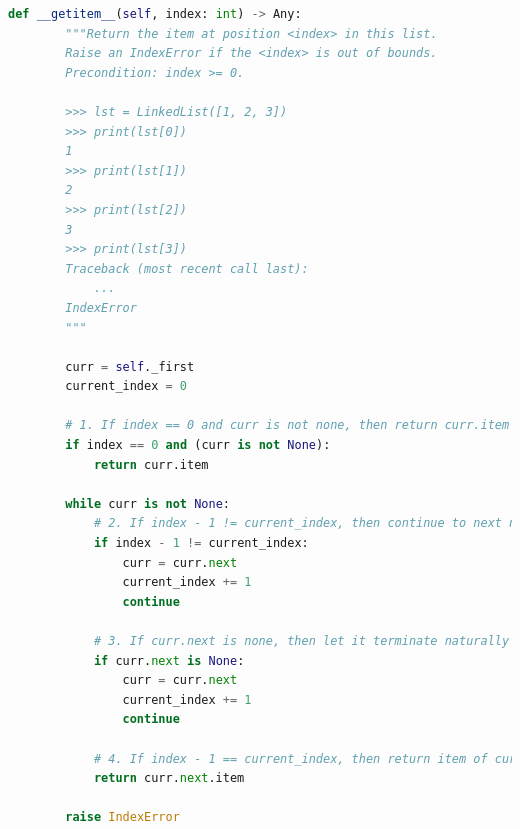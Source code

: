 \documentclass[12pt]{article}
\begin{document}
\begin{lstlisting}[language=Python,caption={worksheet\_13\_q2\_solution.py},captionpos=b]
    def __getitem__(self, index: int) -> Any:
        """Return the item at position <index> in this list.
        Raise an IndexError if the <index> is out of bounds.
        Precondition: index >= 0.

        >>> lst = LinkedList([1, 2, 3])
        >>> print(lst[0])
        1
        >>> print(lst[1])
        2
        >>> print(lst[2])
        3
        >>> print(lst[3])
        Traceback (most recent call last):
            ...
        IndexError
        """

        curr = self._first
        current_index = 0

        # 1. If index == 0 and curr is not none, then return curr.item (edge case)
        if index == 0 and (curr is not None):
            return curr.item

        while curr is not None:
            # 2. If index - 1 != current_index, then continue to next node
            if index - 1 != current_index:
                curr = curr.next
                current_index += 1
                continue

            # 3. If curr.next is none, then let it terminate naturally
            if curr.next is None:
                curr = curr.next
                current_index += 1
                continue

            # 4. If index - 1 == current_index, then return item of curr.next
            return curr.next.item

        raise IndexError
\end{lstlisting}
\end{document}
